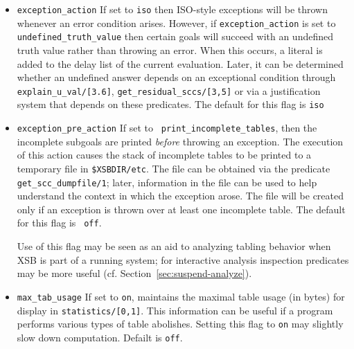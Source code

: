 \begin{description}
\begin{itemize}
\item {\tt exception\_action} If set to {\tt iso} then ISO-style
  exceptions will be thrown whenever an error condition arises.
  However, if {\tt exception\_action} is set to {\tt
    undefined\_truth\_value} then certain goals will succeed with an
  undefined truth value rather than throwing an error.  When this
  occurs, a literal is added to the delay list of the current
  evaluation.  Later, it can be determined whether an undefined answer
  depends on an exceptional condition through {\tt
    explain\_u\_val/[3.6]}, {\tt get\_residual\_sccs/[3,5]} or via a
  justification system that depends on these predicates.  The default
  for this flag is {\tt iso}
%
\item {\tt exception\_pre\_action} If set to {\tt
  print\_incomplete\_tables}, then the incomplete subgoals are printed
  {\em before} throwing an exception.  The execution of this action
  causes the stack of incomplete tables to be printed to a temporary
  file in {\tt \$XSBDIR/etc}.  The file can be obtained via the
  predicate {\tt get\_scc\_dumpfile/1}; later, information in the file
  can be used to help understand the context in which the exception
  arose.  The file will be created only if an exception is thrown over
  at least one incomplete table.  The default for this flag is {\tt
    off}.

  Use of this flag may be seen as an aid to analyzing tabling behavior
  when XSB is part of a running system; for interactive analysis
  inspection predicates may be more useful
  (cf. Section~\ref{sec:suspend-analyze}).
%
\item {\tt max\_tab\_usage} If set to {\tt on}, maintains the maximal
  table usage (in bytes) for display in {\tt statistics/[0,1]}.  This
  information can be useful if a program performs various types of
  table abolishes.  Setting this flag to {\tt on} may slightly slow
  down computation.  Defailt is {\tt off}.

\end{itemize}


%

\end{description}
